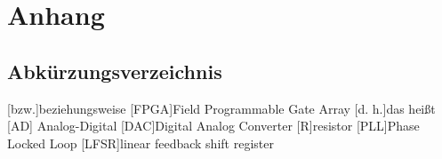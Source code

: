 \documentclass[
    paper=a4,       		%
    fontsize=12pt,			%
    listof=totocnumbered,   %
]{scrreprt}		%
\makeatletter
\renewcommand\listoffigures{%
    \section{\listfigurename}%
    \@mkboth{\MakeUppercase\listfigurename}%
        {\MakeUppercase\listfigurename}%
    \@starttoc{lof}%
}
\makeatother
\begin{document}

\onehalfspacing                  %



\pagebreak
\tableofcontents
\pagebreak



\chapter{Anhang}
\section{Abkürzungsverzeichnis}
\begin{acronym}[LFSR]   %
  [bzw.]{beziehungsweise}
  [FPGA]{Field Programmable Gate Array}
  [d. h.]{das heißt}
  [AD] {Analog-Digital}
  [DAC]{Digital Analog Converter}
  [R]{resistor}
  [PLL]{Phase Locked Loop}
  [LFSR]{linear feedback shift register}
\end{acronym}

\listoffigures      %
\end{document}
